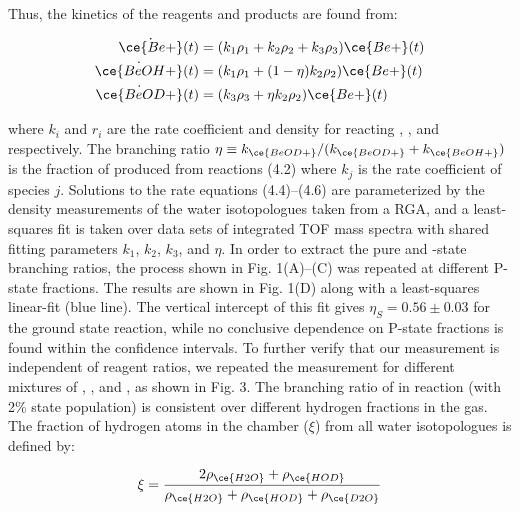 Thus, the kinetics of the reagents and products are found from:

\begin{align}
	\dot{\ce{Be+}}(t) & = (k_1 \rho_1 + k_2 \rho_2 + k_3 \rho_3) \ce{Be+}(t) \\
	\dot{\ce{BeOH+}}(t) & = (k_1 \rho_1 + (1-\eta)k_2 \rho_2) \ce{Be+}(t) \\
	\dot{\ce{BeOD+}}(t) & = (k_3 \rho_3 + \eta k_2 \rho_2) \ce{Be+}(t)
\end{align}

where $k_i$ and $r_i$ are the rate coefficient and density for  reacting , , and  respectively. The branching ratio $\eta \equiv k_{\ce{BeOD+}}/(k_{\ce{BeOD+}} + k_{\ce{BeOH+}})$ is the fraction of  produced from reactions (4.2) where $k_j$ is the rate coefficient of species $j$. Solutions to the rate equations (4.4)–(4.6) are parameterized by the density measurements of the water isotopologues taken from a RGA, and a least-squares fit is taken over data sets of integrated TOF mass spectra with shared fitting parameters $k_1$, $k_2$, $k_3$, and $\eta$. In order to extract the pure  and -state branching ratios, the process shown in Fig. 1(A)–(C) was repeated at different P-state fractions. The results are shown in Fig. 1(D) along with a least-squares linear-fit (blue line). The vertical intercept of this fit gives $\eta_S = 0.56 \pm 0.03$ for the ground  state reaction, while no conclusive dependence on P-state fractions is found within the confidence intervals. To further verify that our measurement is independent of reagent ratios, we repeated the measurement for different mixtures of , , and , as shown in Fig. 3. The branching ratio of  in reaction  (with 2\%  state population) is consistent over different hydrogen fractions in the gas. The fraction of hydrogen atoms in the chamber ($\xi$) from all water isotopologues is defined by:

\begin{equation}
	\xi = \frac{2 \rho_{\ce{H2O}} + \rho_{\ce{HOD}}}{\rho_{\ce{H2O}} + \rho_{\ce{HOD}} + \rho_{\ce{D2O}}}
\end{equation}

